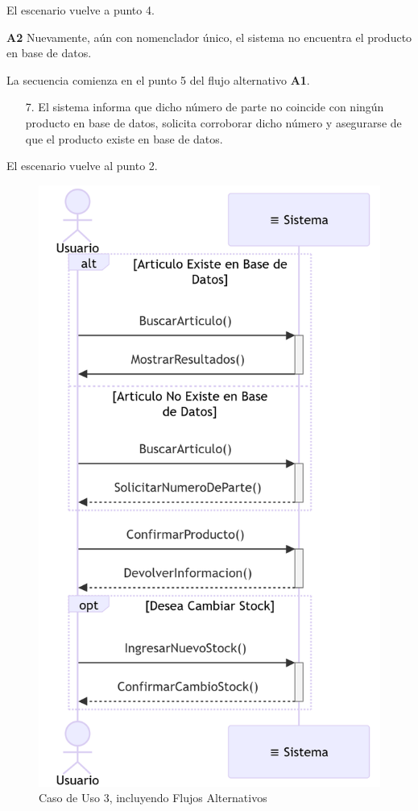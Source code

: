 El escenario vuelve a punto 4.

\textbf{A2} Nuevamente, aún con nomenclador único, el sistema no encuentra el producto en base de datos.

La secuencia comienza en el punto 5 del flujo alternativo \textbf{A1}.

\begin{enumerate}
	\item [7.] El sistema informa que dicho número de parte no coincide con ningún producto en base de datos, 
	solicita corroborar dicho número y asegurarse de que el producto existe en base de datos.
\end{enumerate}

El escenario vuelve al punto 2.

\begin{figure}[H]
	\centering
	\vspace{15pt}
	\caption{Caso de Uso 3, incluyendo Flujos Alternativos}
	\vspace{15pt}
	\includegraphics[width=.7\textwidth]{img/04-diagrama-caso-3.png}
	\vspace{15pt}
\end{figure}

